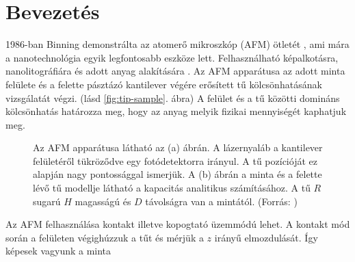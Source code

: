 \section{Bevezetés}
	1986-ban Binning demonstrálta az atomerő mikroszkóp (AFM) ötletét \cite{Binnig1986}, ami mára 
	a nanotechnológia egyik legfontosabb eszköze lett. Felhasználható képalkotásra, nanolitográfiára és 
	adott anyag alakítására \cite{Vasic2013}.
	Az AFM apparátusa az adott minta felülete és a felette pásztázó kantilever végére erősített tű 
	kölcsönhatásának vizsgálatát végzi. (lásd \ref{fig:tip-sample}. ábra)
	A felület és a tű közötti domináns kölcsönhatás határozza meg, hogy az anyag melyik fizikai
	mennyiségét kaphatjuk meg.
	\begin{figure}[H]
		\centering
		\hfil
		\caption{\scriptsize Az AFM apparátusa látható az (a) ábrán. A lázernyaláb
		a kantilever felületéről tükröződve egy fotódetektorra irányul. A tű pozícióját ez alapján nagy pontossággal ismerjük. A
		(b) ábrán a minta és a felette lévő tű modellje látható a kapacitás analitikus számításához.
		A tű $R$ sugarú $H$ magasságú és $D$ távolságra van a mintától. (Forrás: \cite{Butt20051})}
		\label{fig_sim}
	\end{figure}
	Az AFM felhasználása kontakt illetve kopogtató üzemmódú lehet. A kontakt mód során a
	felületen végighúzzuk a tűt és mérjük a $z$ irányű elmozdulását. Így képesek vagyunk a minta
